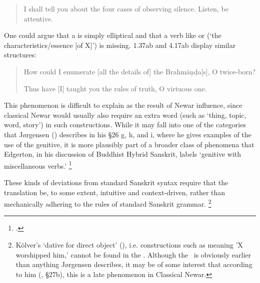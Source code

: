 \begin{quote}

        I shall tell you about the four cases of observing silence. 
        Listen, be attentive.
\end{quote}

\noindent
One could argue that  a is simply elliptical and that
a verb like  or  
(`the characteristics/\thinspace essence [of X]') is missing. 1.37ab and 4.17ab
display similar structures:

\begin{quote}


How could I enumerate [all the details of] the Brahmāṇḍa[s], O twice-born?


Thus have [I] taught you the rules of truth, O virtuous one.

\end{quote}

\noindent
This phenomenon is difficult to explain as the result of Newar influence, since
classical Newar would usually also require an extra word (such as  `thing, topic, word, story') 
in such constructions. While it may fall into one of the categories that 
Jørgensen (\citeyear{JorgensenGrammar}) describes in his \S 26 g, h, and i, 
where he gives examples of the use of the genitive,
it is more plausibly part of a broader class of phenomena that Edgerton,
in his discussion of Buddhist Hybrid Sanskrit,
labels `genitive with miscellaneous verbs.'%
		\footnote{.}


These kinds of deviations from standard Sanskrit syntax require that 
the translation be, to some extent, intuitive and context-driven,
rather than mechanically adhering to the rules of standard Sanskrit grammar.%
        \footnote{Kölver's `dative for direct object'
                (), i.e. constructions such as 
                 meaning  'X worshipped him,' cannot be found in the \VSS.
                Although the \VSS\ is obviously earlier than anything Jørgensen describes,
                it may be of some interest that according to him (\citeyear{JorgensenGrammar}, \S 27b),
                this is a late phenomenon in Classical Newar.}

